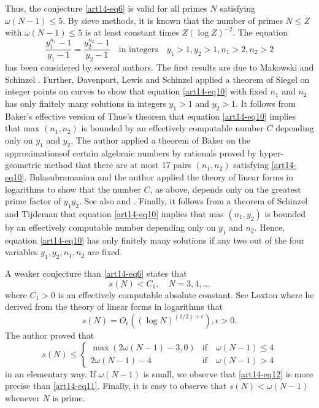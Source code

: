 Thus, the conjecture \eqref{art14-eq6} is valid for all primes $N$ satisfying $\omega(N-1)\leq 5$. By sieve methods, it is known that the number of primes $N\leq Z$ with $\omega(N-1)\leq 5$ is at least constant times $Z(\log Z)^{-2}$. The equation
\begin{equation}
\frac{y^{n_{1}}_{1}-1}{y_{1}-1}=\frac{y^{n_{2}}_{2}-1}{y_{2}-1}\quad\text{in integers~~ } y_{1}>1, y_{2}>1, n_{1}>2, n_{2}>2\label{art14-eq10}
\end{equation}
has been considered by several authors. The first results are due to Makowski and Schinzel \cite{art14-key14}. Further, Davenport, Lewis and Schinzel \cite{art14-key6} applied a theorem of Siegel on integer points on curves to show that equation \eqref{art14-eq10} with fixed $n_{1}$ and $n_{2}$ has only finitely many solutions in integers $y_{1}>1$ and $y_{2}>1$. It follows from Baker's effective version \cite{art14-key2} of Thue's theorem \cite{art14-key36} that equation \eqref{art14-eq10} implies that max $(n_{1},n_{2})$ is bounded by an effectively computable number $C$ depending only on $y_{1}$ and $y_{2}$, The author \cite{art14-key26} applied a theorem of Baker \cite{art14-key1} on the approximations\pageoriginale of certain algebraic numbers by rationals proved by hyper-geometric method that there are at most 17 pairs $(n_{1},n_{2})$ satisfying \eqref{art14-eq10}. Balasubramanian and the author \cite{art14-key4} applied the theory of linear forms in logarithms to show that the number $C$, as above, depends only on the greatest prime factor of $y_{1}y_{2}$. See also \cite{art14-key23} and \cite{art14-key27}. Finally, it follows from a theorem of Schinzel and Tijdeman \cite{art14-key22} that equation \eqref{art14-eq10} implies that mas $(n_{1},y_{2})$ is bounded by an effectively computable number depending only on $y_{1}$ and $n_{2}$. Hence, equation \eqref{art14-eq10} has only finitely many solutions if any two out of the four variables $y_{1},y_{2},n_{1},n_{2}$ are fixed.

A weaker conjecture than \eqref{art14-eq6} states that
$$
s(N)<C_{1},\quad N=3,4,\ldots
$$
where $C_{1}>0$ is an effectively computable absolute constant. See Loxton \cite{art14-key13} where he derived from the theory of linear forms in logarithms that
\begin{equation}
s(N)=O_{\epsilon}((\log N)^{(1/2)+\epsilon}),\epsilon>0.\label{art14-eq11}
\end{equation}
The author \cite{art14-key29} proved that
\begin{equation}
s(N)\leq 
\begin{cases}
\max (2\omega(N-1)-3,0) & \text{if~~ }\omega(N-1)\leq 4\\
2\omega(N-1)-4 & \text{if~~ } \omega(N-1)>4
\end{cases}
\end{equation}
in an elementary way. If $\omega(N-1)$ is small, we observe that \eqref{art14-eq12} is more precise than \eqref{art14-eq11}. Finally, it is easy to observe that $s(N)<\omega(N-1)$ whenever $N$ is prime.


